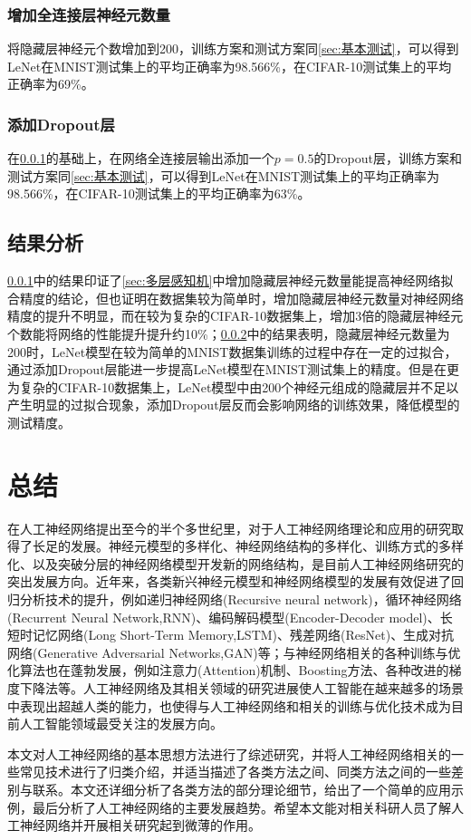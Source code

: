 \documentclass[a4paper]{ctexart}
\begin{document}
\begin{spacing}{1.3}
\subsubsection{增加全连接层神经元数量}\label{sec:增加神经元数量}
将隐藏层神经元个数增加到200，训练方案和测试方案同\ref{sec:基本测试}，可以得到LeNet在MNIST测试集上的平均正确率为98.566\%，在CIFAR-10测试集上的平均正确率为69\%。

\subsubsection{添加Dropout层}\label{sec:添加Dropout层}
在\ref{sec:增加神经元数量}的基础上，在网络全连接层输出添加一个$p=0.5$的Dropout层，训练方案和测试方案同\ref{sec:基本测试}，可以得到LeNet在MNIST测试集上的平均正确率为98.566\%，在CIFAR-10测试集上的平均正确率为63\%。

\subsection{结果分析}
\ref{sec:增加神经元数量}中的结果印证了\ref{sec:多层感知机}中增加隐藏层神经元数量能提高神经网络拟合精度的结论，但也证明在数据集较为简单时，增加隐藏层神经元数量对神经网络精度的提升不明显，而在较为复杂的CIFAR-10数据集上，增加3倍的隐藏层神经元个数能将网络的性能提升提升约10\%；\ref{sec:添加Dropout层}中的结果表明，隐藏层神经元数量为200时，LeNet模型在较为简单的MNIST数据集训练的过程中存在一定的过拟合，通过添加Dropout层能进一步提高LeNet模型在MNIST测试集上的精度。但是在更为复杂的CIFAR-10数据集上，LeNet模型中由200个神经元组成的隐藏层并不足以产生明显的过拟合现象，添加Dropout层反而会影响网络的训练效果，降低模型的测试精度。

\section{总结}
在人工神经网络提出至今的半个多世纪里，对于人工神经网络理论和应用的研究取得了长足的发展。神经元模型的多样化、神经网络结构的多样化、训练方式的多样化、以及突破分层的神经网络模型开发新的网络结构，是目前人工神经网络研究的突出发展方向。近年来，各类新兴神经元模型和神经网络模型的发展有效促进了回归分析技术的提升，例如递归神经网络(Recursive neural network)\cite{RN139}，循环神经网络(Recurrent Neural Network,RNN)\cite{RN140}、编码解码模型(Encoder-Decoder model)\cite{RN143}、长短时记忆网络(Long Short-Term Memory,LSTM)\cite{RN141}、残差网络(ResNet)\cite{RN142}、生成对抗网络(Generative Adversarial Networks,GAN)\cite{RN144}等；与神经网络相关的各种训练与优化算法也在蓬勃发展，例如注意力(Attention)机制\cite{RN145}、Boosting方法\cite{RN146}、各种改进的梯度下降法\cite{RN147}\cite{RN148}\cite{RN149}等。人工神经网络及其相关领域的研究进展使人工智能在越来越多的场景中表现出超越人类的能力，也使得与人工神经网络和相关的训练与优化技术成为目前人工智能领域最受关注的发展方向。

本文对人工神经网络的基本思想方法进行了综述研究，并将人工神经网络相关的一些常见技术进行了归类介绍，并适当描述了各类方法之间、同类方法之间的一些差别与联系。本文还详细分析了各类方法的部分理论细节，给出了一个简单的应用示例，最后分析了人工神经网络的主要发展趋势。希望本文能对相关科研人员了解人工神经网络并开展相关研究起到微薄的作用。

\end{spacing}


\end{document}
